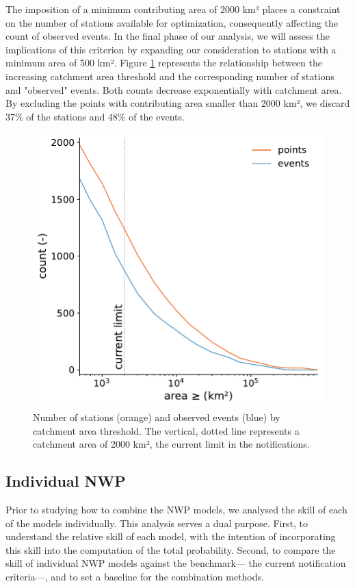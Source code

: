 \documentclass[preprint,12pt,authoryear]{elsarticle}
\begin{document}
The imposition of a minimum contributing area of 2000 km² places a constraint on the number of stations available for optimization, consequently affecting the count of observed events. In the final phase of our analysis, we will assess the implications of this criterion by expanding our consideration to stations with a minimum area of 500 km². Figure \ref{fig:observed_vs_area} represents the relationship between the increasing catchment area threshold and the corresponding number of stations and "observed" events. Both counts decrease exponentially with catchment area. By excluding the points with contributing area smaller than 2000 km², we discard 37\% of the stations and 48\% of the events.

\begin{figure}
    \centering
    \includegraphics[width=0.5\linewidth]{figures/points_observedEvents_vs_area_2000km2_1239points.pdf}
    \caption{Number of stations (orange) and observed events (blue) by catchment area threshold. The vertical, dotted line represents a catchment area of 2000 km², the current limit in the notifications.}
    \label{fig:observed_vs_area}
\end{figure}

\subsection{Individual NWP}
\label{sec:results_NWP}

Prior to studying how to combine the NWP models, we analysed the skill of each of the models individually. This analysis serves a dual purpose. First, to understand the relative skill of each model, with the intention of incorporating this skill into the computation of the total probability. Second, to compare the skill  of individual NWP models against the benchmark— the current notification criteria—, and to set a baseline for the combination methods.
\end{document}
